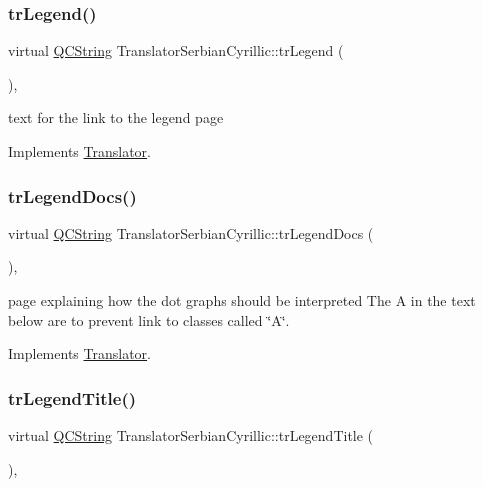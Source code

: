 \subsubsection{\texorpdfstring{trLegend()}{trLegend()}}
{\footnotesize\ttfamily virtual \mbox{\hyperlink{class_q_c_string}{Q\+C\+String}} Translator\+Serbian\+Cyrillic\+::tr\+Legend (\begin{DoxyParamCaption}{ }\end{DoxyParamCaption})\hspace{0.3cm}{\ttfamily [inline]}, {\ttfamily [virtual]}}

text for the link to the legend page 

Implements \mbox{\hyperlink{class_translator}{Translator}}.

\mbox{\label{class_translator_serbian_cyrillic_ab7f39c42a0e790816df7723eef4fcc21}} 
\subsubsection{\texorpdfstring{trLegendDocs()}{trLegendDocs()}}
{\footnotesize\ttfamily virtual \mbox{\hyperlink{class_q_c_string}{Q\+C\+String}} Translator\+Serbian\+Cyrillic\+::tr\+Legend\+Docs (\begin{DoxyParamCaption}{ }\end{DoxyParamCaption})\hspace{0.3cm}{\ttfamily [inline]}, {\ttfamily [virtual]}}

page explaining how the dot graph\textquotesingle{}s should be interpreted The A in the text below are to prevent link to classes called \char`\"{}\+A\char`\"{}. 

Implements \mbox{\hyperlink{class_translator}{Translator}}.

\mbox{\label{class_translator_serbian_cyrillic_a862a73dd2e1fb19e00cd8f13ef20dfa2}} 
\subsubsection{\texorpdfstring{trLegendTitle()}{trLegendTitle()}}
{\footnotesize\ttfamily virtual \mbox{\hyperlink{class_q_c_string}{Q\+C\+String}} Translator\+Serbian\+Cyrillic\+::tr\+Legend\+Title (\begin{DoxyParamCaption}{ }\end{DoxyParamCaption})\hspace{0.3cm}{\ttfamily [inline]}, {\ttfamily [virtual]}}

